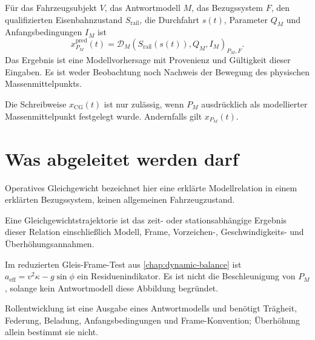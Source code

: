 \begin{definition}
\label{def:cg-state}
Für das Fahrzeugsubjekt \(V\), das Antwortmodell \(M\), das Bezugssystem \(F\),
den qualifizierten Eisenbahnzustand \(S_{\mathrm{rail}}\), die Durchfahrt
\(s(t)\), Parameter \(Q_M\) und Anfangsbedingungen \(I_M\) ist
\[
x_{P_M}^{\mathrm{pred}}(t)
=
\mathcal D_M(S_{\mathrm{rail}}(s(t)),Q_M,I_M)_{{P_M},F}.
\]
Das Ergebnis ist eine Modellvorhersage mit Provenienz und Gültigkeit dieser
Eingaben. Es ist weder Beobachtung noch Nachweis der Bewegung des physischen
Massenmittelpunkts.
\end{definition}

\begin{definition}[Schwerpunkttrajektorie]
\label{def:cg-trajectory}
Die Schreibweise \(x_{\mathrm{CG}}(t)\) ist nur zulässig, wenn \(P_M\)
ausdrücklich als modellierter Massenmittelpunkt festgelegt wurde. Andernfalls
gilt \(x_{P_M}(t)\).
\end{definition}

\section{Was abgeleitet werden darf}

\begin{definition}
\label{def:operational-balance}
Operatives Gleichgewicht bezeichnet hier eine erklärte Modellrelation in
einem erklärten Bezugssystem, keinen allgemeinen Fahrzeugzustand.
\end{definition}

\begin{definition}[Gleichgewichtstrajektorie]
\label{def:balance-trajectory}
Eine Gleichgewichtstrajektorie ist das zeit- oder stationsabhängige Ergebnis
dieser Relation einschließlich Modell, Frame, Vorzeichen-, Geschwindigkeits-
und Überhöhungsannahmen.
\end{definition}

\begin{definition}
\label{def:effective-operational-acceleration}
Im reduzierten Gleis-Frame-Test aus \cref{chap:dynamic-balance} ist
\(a_{\mathrm{eff}}=v^2\kappa-g\sin\phi\) ein Residuenindikator. Es ist nicht
die Beschleunigung von \(P_M\), solange kein Antwortmodell diese Abbildung
begründet.
\end{definition}

\begin{definition}[Rollentwicklung]
\label{def:roll-evolution}
Rollentwicklung ist eine Ausgabe eines Antwortmodells und benötigt Trägheit,
Federung, Beladung, Anfangsbedingungen und Frame-Konvention; Überhöhung allein
bestimmt sie nicht.
\end{definition}

